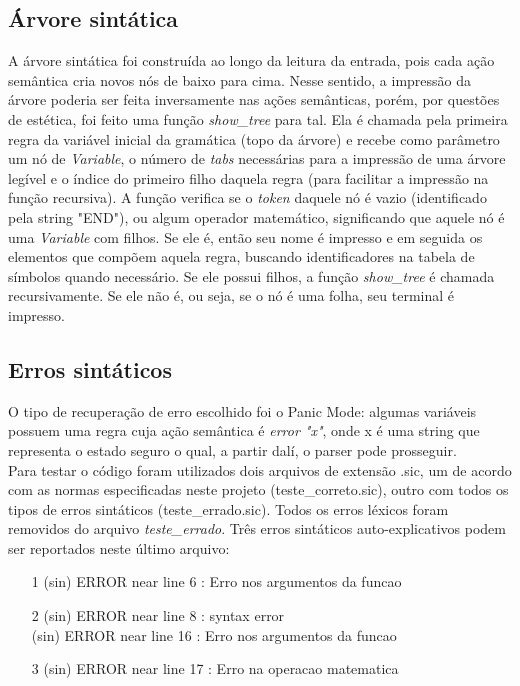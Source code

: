 \documentclass[12pt]{article}
\begin{document}
\subsection{Árvore sintática}
\indent A árvore sintática foi construída ao longo da leitura da entrada, pois cada ação semântica cria novos nós de baixo para cima. Nesse sentido, a impressão da árvore poderia ser feita inversamente nas ações semânticas, porém, por questões de estética, foi feito uma função \textit{show\_tree} para tal. Ela é chamada pela primeira regra da variável inicial da gramática (topo da árvore) e recebe como parâmetro um nó de \textit{Variable}, o número de \textit{tabs} necessárias para a impressão de uma árvore legível e o índice do primeiro filho daquela regra (para facilitar a impressão na função recursiva). A função verifica se o \textit{token} daquele nó é vazio (identificado pela string "END"), ou algum operador matemático, significando que aquele nó é uma \textit{Variable} com filhos. Se ele é, então seu nome é impresso e em seguida os elementos que compõem aquela regra, buscando identificadores na tabela de símbolos quando necessário. Se ele possui filhos, a função \textit{show\_tree} é chamada recursivamente. Se ele não é, ou seja, se o nó é uma folha,  seu terminal é impresso.

\subsection{Erros sintáticos}

\indent O tipo de recuperação de erro escolhido foi o Panic Mode: algumas variáveis possuem uma regra cuja ação semântica é \textit{error "x"}, onde x é uma string que representa o estado seguro o qual, a partir dalí, o parser pode prosseguir. \\
\indent Para testar o código foram utilizados dois arquivos de extensão .sic, um de acordo com as normas especificadas neste projeto (teste\_correto.sic), outro com todos os tipos de erros sintáticos (teste\_errado.sic). Todos os erros léxicos foram removidos do arquivo \textit{teste\_errado}. Três erros sintáticos auto-explicativos podem ser reportados neste último arquivo:
\begin{itemize}
  \item[1] (sin) ERROR near line 6 : Erro nos argumentos da funcao
  \item[2] (sin) ERROR near line 8 : syntax error \\ (sin) ERROR near line 16 : Erro nos argumentos da funcao
  \item[3] (sin) ERROR near line 17 : Erro na operacao matematica
\end{itemize}
\end{document}
